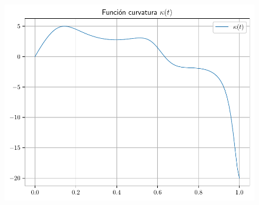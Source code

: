\begin{frame}
    \begin{solution}
        \begin{figure}[ht!]
            \centering
            \includegraphics[width=.72\paperwidth]{p1_curvature}
        \end{figure}
    \end{solution}
\end{frame}